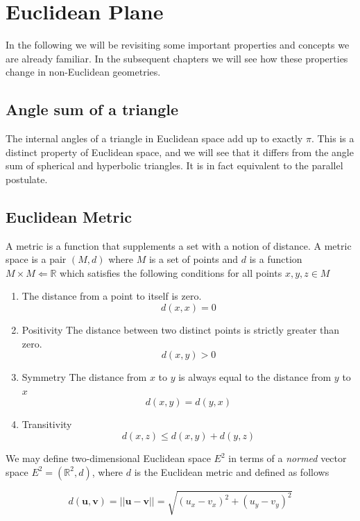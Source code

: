 \section{Euclidean Plane}\label{tessellations-of-the-euclidean-plane}

In the following we will be revisiting some important properties and concepts we are already familiar. In the subsequent chapters we will see how these properties change in non-Euclidean geometries.

\subsection{Angle sum of a triangle}

The internal angles of a triangle in Euclidean space add up to exactly $\pi$. This is a distinct property of Euclidean space, and we will see that it differs from the angle sum of spherical and hyperbolic triangles. It is in fact equivalent to the parallel postulate.


\subsection{Euclidean Metric}

A metric is a function that supplements a set with a notion of distance. A metric space is a pair \((M, d)\) where $M$ is a set of points and $d$ is a function $M \times M \Leftarrow \mathbb{R}$ which satisfies the following conditions for all points $x, y, z \in M$

\begin{enumerate}
  \item The distance from a point to itself is zero. 
  \[d(x, x) = 0\]
  \item{Positivity} The distance between two distinct points is strictly greater than zero.
  \[d(x, y) > 0\]
  \item{Symmetry} The distance from $x$ to $y$ is always equal to the distance from $y$ to $x$ 
  \[d(x, y) = d(y, x)\]
  \item{Transitivity} 
  \[d(x, z) \le d(x, y) + d(y, z)\]
\end{enumerate}

We may define two-dimensional Euclidean space $E^2$ in terms of a \emph{normed} vector space $E^2 = (\mathbb{R}^2, d)$, where $d$ is the Euclidean metric and defined as follows

\[
d(\mathbf{u}, \mathbf{v}) = ||\mathbf{u} - \mathbf{v}|| = \sqrt{(u_x - v_x)^2 + (u_y - v_y)^2}
\]

